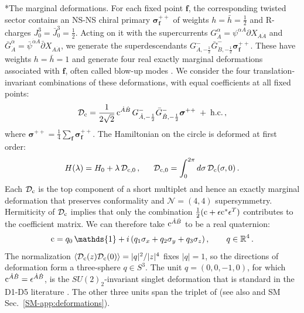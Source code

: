 \documentclass[aps,twocolumn,preprintnumbers,groupedaddress,nofootinbib,prl]{revtex4-2}
\makeatletter
\renewcommand\paragraph{\@startsection{paragraph}{4}{\parindent}{\z@}{-1em}{\normalfont\normalsize\bfseries}}
\newcommand{\Def}{\mathcal D}
\newcommand{\cMat}{{\rm c}}
\newcommand{\twist}{{\boldsymbol\sigma}}
\newcommand{\lam}{\lambda}
\newcommand{\bff}{\mathbf f}
\newcommand{\Dc}{\Def_{\cMat}}
\newcommand{\Dcz}{\Def_{\cMat,0}}
\makeatother
\begin{document}
\paragraph*{The marginal deformations.}
For each fixed point $\bff$, the corresponding twisted sector contains an NS-NS chiral primary $\twist_\bff^{++}$ of weights $h=\bar h = \frac12$ and R-charges $J_0^3 = \bar{J}_0^3=\frac12$. Acting on it with the supercurrents $G^\alpha_{\dot A}=\psi^{\alpha A}\partial X_{A\dot A}$ and $\bar G^{\dot\alpha}_{\dot A}=\bar\psi^{\dot\alpha A}\bar\partial X_{A\dot A}$, we generate the superdescendants $G^{-}_{\dot A,-\frac12}\bar G^{-}_{\dot B,-\frac12} \twist_{\bff}^{++}$. These have weights $h=\bar h=1$ and generate four real exactly marginal deformations associated with $\bff$, often called blow-up modes \cite{Dixon:1986qv,Nahm:1999ps}. We consider the four translation-invariant combinations of
these deformations, with equal coefficients at all fixed points:
\begin{equation}
\label{eq:Dc}
\Dc=\frac{1}{2\sqrt2}\,\cMat^{\dot A\dot B}\,G^{-}_{\dot A,-\frac12}\bar G^{-}_{\dot B,-\frac12}\twist^{++} \; + \; \text{h.c.}\,,
\end{equation}
where $\twist^{++}=\frac14\sum_\bff\twist^{++}_\bff$.
The Hamiltonian on the circle is deformed at first order:
\begin{equation}
\label{eq:HDc}
H(\lam)=H_0+\lam\,\Dcz \,,\quad\;\; \Dcz=\int_0^{2\pi}d\sigma\,\Dc(\sigma,0)\,.
\end{equation}
Each $\Dc$ is the top component of a short multiplet and hence an exactly marginal deformation that preserves conformality and $\mathcal N=(4,4)$ supersymmetry. Hermiticity of $\Dc$ implies that only the combination $\frac{1}{2}(\cMat+\epsilon \cMat^* \epsilon^T)$ contributes to the coefficient matrix. We can therefore take $\cMat^{\dot A \dot B}$ to be a real quaternion:
\begin{equation}
\label{eq:quaternion}
\cMat=q_0 \, \mathds{1}+ i \,(q_1\sigma_x+q_2\sigma_y+q_3\sigma_z)\,,\qquad q\in\mathbb R^4\,.
\end{equation}
The normalization $\langle\Dc(z)\Dc(0)\rangle=|q|^2/|z|^4$ fixes $|q|=1$, so the directions of deformation form a three-sphere $q\in S^3$. The unit $q=(0,0,-1,0)$, for which $\cMat^{\dot A\dot B}=\epsilon^{\dot A\dot B}$, is the $SU(2)_2$-invariant singlet deformation that is standard in the D1-D5 literature \cite{Avery:2010er,Guo:2019ady}. The other three units span the triplet of \cite{Gaberdiel:2025smz} (see also \cite{Keller:2019suk} and SM Sec.~\ref{SM-app:deformations}).\\
\end{document}
